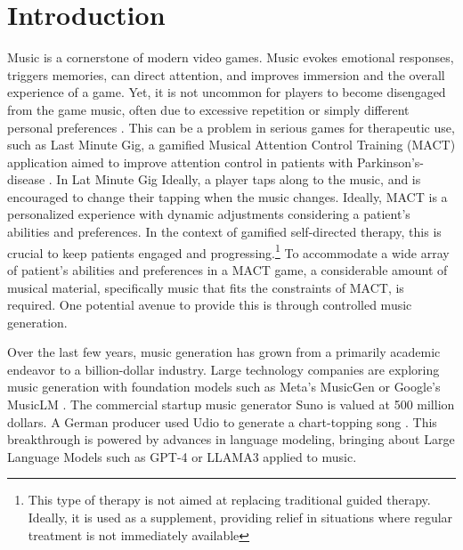 

\chapter{Introduction}
\label{chap:intro}
\pagestyle{fancy}

Music is a cornerstone of modern video games. Music evokes emotional responses, triggers memories, can direct attention, and improves immersion and the overall experience of a game. Yet, it is not uncommon for players to become disengaged from the game music, often due to excessive repetition or simply different personal preferences \cite{Rogers_Weber_2019}. This can be a problem in serious games for therapeutic use, such as Last Minute Gig, a gamified Musical Attention Control Training (MACT) application aimed to improve attention control in patients with Parkinson's-disease \cite{Chalkiadakis_2022}. In Lat Minute Gig Ideally, a player taps along to the music, and is encouraged to change their tapping when the music changes. Ideally, MACT is a personalized experience with dynamic adjustments considering a patient's abilities and preferences. In the context of gamified self-directed therapy, this is crucial to keep patients engaged and progressing.\footnote{This type of therapy is not aimed at replacing traditional guided therapy. Ideally, it is used as a supplement,  providing relief in situations where regular treatment is not immediately available} To accommodate a wide array of patient's abilities and preferences in a MACT game, a considerable amount of musical material, specifically music that fits the constraints of MACT, is required. One potential avenue to provide this is through controlled music generation.

Over the last few years, music generation has grown from a primarily academic endeavor to a billion-dollar industry. Large technology companies are exploring music generation with foundation models such as Meta’s MusicGen \cite{copet2023simple} or Google’s MusicLM 
\cite{Agostinelli_Denk_Borsos_Engel_Verzetti_Caillon_Huang_Jansen_Roberts_Tagliasacchi_et_al._2023}. The commercial startup music generator Suno is valued at 500 million dollars. A German producer used Udio to generate a chart-topping song \cite{Ferdinand_Meyen_2024}\cite{Stassen_2024}. This breakthrough is powered by advances in language modeling, bringing about Large Language Models such as GPT-4 or LLAMA3 applied to music.

